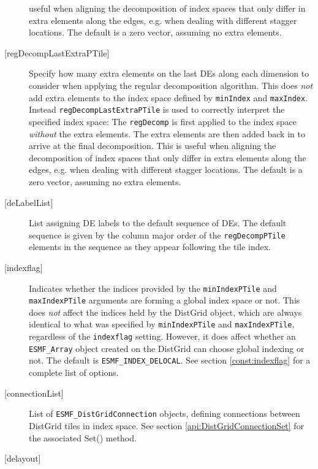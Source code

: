 \begin{description}
            useful when aligning the decomposition of index spaces that only
            differ in extra elements along the edges, e.g. when dealing with
            different stagger locations.
            The default is a zero vector, assuming no extra elements.
       \item[{[regDecompLastExtraPTile]}]
            Specify how many extra elements on the last DEs along each 
            dimension to consider when applying the regular decomposition 
            algorithm. This does {\em not} add extra elements to the 
            index space defined by {\tt minIndex} and {\tt maxIndex}. Instead
            {\tt regDecompLastExtraPTile} is used to correctly interpret the 
            specified index space: The {\tt regDecomp} is first applied to the
            index space {\em without} the extra elements. The extra elements are
            then added back in to arrive at the final decomposition. This is 
            useful when aligning the decomposition of index spaces that only
            differ in extra elements along the edges, e.g. when dealing with
            different stagger locations.
            The default is a zero vector, assuming no extra elements.
       \item[{[deLabelList]}]
            List assigning DE labels to the default sequence of DEs. The default
            sequence is given by the column major order of the {\tt regDecompPTile}
            elements in the sequence as they appear following the tile index.
       \item[{[indexflag]}]
            Indicates whether the indices provided by the {\tt minIndexPTile} and
            {\tt maxIndexPTile} arguments are forming a global index space or 
            not. This does {\em not} affect the indices held by the DistGrid 
            object, which are always identical to what was specified by 
            {\tt minIndexPTile} and {\tt maxIndexPTile}, regardless of the
            {\tt indexflag} setting. However, it does affect whether an
            {\tt ESMF\_Array} object created on the DistGrid can choose global
            indexing or not. The default is {\tt ESMF\_INDEX\_DELOCAL}.
            See section \ref{const:indexflag} for a complete list of options.
       \item[{[connectionList]}]
            List of {\tt ESMF\_DistGridConnection} objects, defining connections
            between DistGrid tiles in index space.
            See section \ref{api:DistGridConnectionSet} for the associated Set()
            method.
       \item[{[delayout]}]

\end{description}
